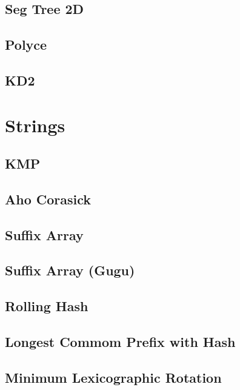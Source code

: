 \subsection{Seg Tree 2D}
\raggedbottom
\hrulefill
\subsection{Polyce}
\raggedbottom
\hrulefill
\subsection{KD2}
\raggedbottom
\hrulefill

\section{Strings}
\subsection{KMP}
\raggedbottom
\hrulefill
\subsection{Aho Corasick}
\raggedbottom
\hrulefill
\subsection{Suffix Array}
\raggedbottom
\hrulefill
\subsection{Suffix Array (Gugu)}
\raggedbottom
\hrulefill
\subsection{Rolling Hash}
\raggedbottom
\hrulefill
\subsection{Longest Commom Prefix with Hash}
\raggedbottom
\hrulefill
\subsection{Minimum Lexicographic Rotation}
\raggedbottom
\hrulefill
